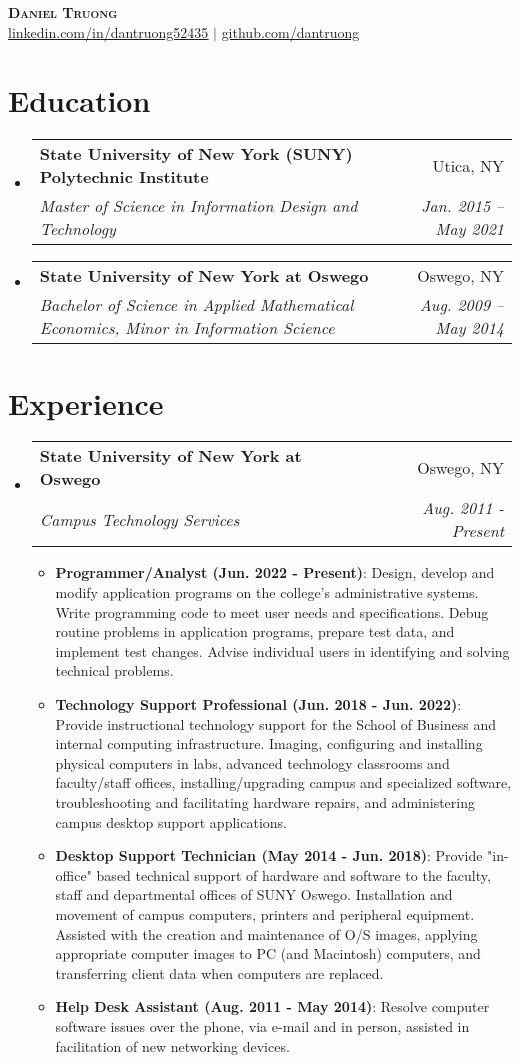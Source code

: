 \documentclass[letterpaper,11pt]{article}
\makeatletter
\newcommand{\resumeItem}[2]{
  \item\small{
    \textbf{#1}{: #2 \vspace{-2pt}}
  }
}
\newcommand{\resumeSubheading}[4]{
  \vspace{-1pt}\item
    \begin{tabular*}{0.97\textwidth}[t]{l@{\extracolsep{\fill}}r}
      \textbf{#1} & #2 \\
      \textit{\small#3} & \textit{\small #4} \\
    \end{tabular*}\vspace{-5pt}
}
\newcommand{\resumeSubHeadingListStart}{\begin{itemize}[leftmargin=*]}
\newcommand{\resumeSubHeadingListEnd}{\end{itemize}}
\newcommand{\resumeItemListStart}{\begin{itemize}}
\newcommand{\resumeItemListEnd}{\end{itemize}\vspace{-5pt}}
\makeatother
\begin{document}

\begin{center}
    \textbf{\Huge \scshape Daniel Truong} \\ \vspace{1pt}
    \href{https://linkedin.com/in/dantruong52435}{\underline{linkedin.com/in/dantruong52435}} $|$
    \href{https://github.com/dantruong}{\underline{github.com/dantruong}}
\end{center}

\section{Education}
  	\resumeSubHeadingListStart
    		\resumeSubheading
      		{State University of New York (SUNY) Polytechnic Institute}{Utica, NY}
      		{Master of Science in Information Design and Technology}{Jan. 2015 -- May  2021}
    		\resumeSubheading
      		{State University of New York at Oswego}{Oswego, NY}
      		{Bachelor of Science in Applied Mathematical Economics, Minor in Information Science}{Aug. 2009 -- May 2014}
  	\resumeSubHeadingListEnd

\section{Experience}
  	\resumeSubHeadingListStart
    	\resumeSubheading
      		{State University of New York at Oswego}{Oswego, NY}
      		{Campus Technology Services}{Aug. 2011 - Present}
      		\resumeItemListStart
				\resumeItem{Programmer/Analyst (Jun. 2022 - Present)}
				{Design, develop and modify application programs on the college's administrative systems. Write programming code to meet user needs and specifications. Debug routine problems in application programs, prepare test data, and implement test changes. Advise individual users in identifying and solving technical problems.}
				\resumeItem{Technology Support Professional (Jun. 2018 - Jun. 2022)}
				{Provide instructional technology support for the School of Business and internal computing infrastructure. Imaging, configuring and installing physical computers in labs, advanced technology classrooms and faculty/staff offices, installing/upgrading campus and specialized software,  troubleshooting and facilitating hardware repairs, and administering campus desktop support applications.}
				\resumeItem{Desktop Support Technician (May 2014 - Jun. 2018)}
				{Provide "in-office" based technical support of hardware and software to the faculty, staff and departmental offices of SUNY Oswego. Installation and movement of campus computers, printers and peripheral equipment. Assisted with the creation and maintenance of O/S images, applying appropriate computer images to PC (and Macintosh) computers, and transferring client data when computers are replaced.}
				\resumeItem{Help Desk Assistant (Aug. 2011 - May 2014)}
				{Resolve computer software issues over the phone, via e-mail and in person, assisted in facilitation of new networking devices.}
      		\resumeItemListEnd
  	\resumeSubHeadingListEnd
\end{document}
